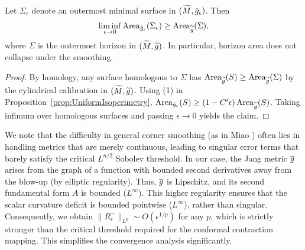 \begin{corollary}\label{cor:IsoperimetricStability}
Let $\Sigma_\epsilon$ denote an outermost minimal surface in $(\widetilde{M},\hat g_\epsilon)$. Then
\[
    \liminf_{\epsilon\to 0} \operatorname{Area}_{\hat g_\epsilon}(\Sigma_\epsilon) \ge \operatorname{Area}_{\widetilde{g}}(\Sigma),
\]
where $\Sigma$ is the outermost horizon in $(\widetilde{M},\widetilde{g})$. In particular, horizon area does not collapse under the smoothing.
\end{corollary}
\begin{proof}
By homology, any surface homologous to $\Sigma$ has $\operatorname{Area}_{\widetilde{g}}(S)\ge \operatorname{Area}_{\widetilde{g}}(\Sigma)$ by the cylindrical calibration in $(\widetilde{M},\widetilde{g})$. Using (1) in Proposition~\ref{prop:UniformIsoperimetry}, $\operatorname{Area}_{\hat g_\epsilon}(S)\ge (1-C'\epsilon)\operatorname{Area}_{\widetilde{g}}(S)$. Taking infimum over homologous surfaces and passing $\epsilon\to 0$ yields the claim.
\end{proof}

\begin{remark}
We note that the difficulty in general corner smoothing (as in Miao \cite{miao2002}) often lies in handling metrics that are merely continuous, leading to singular error terms that barely satisfy the critical $L^{n/2}$ Sobolev threshold.
In our case, the Jang metric $\overline{g}$ arises from the graph of a function with bounded second derivatives away from the blow-up (by elliptic regularity). Thus, $\overline{g}$ is Lipschitz, and its second fundamental form $A$ is bounded ($L^\infty$).
This higher regularity ensures that the scalar curvature deficit is bounded pointwise ($L^\infty$), rather than singular. Consequently, we obtain $\|R^-_\epsilon\|_{L^p} \sim O(\epsilon^{1/p})$ for any $p$, which is strictly stronger than the critical threshold required for the conformal contraction mapping. This simplifies the convergence analysis significantly.
\end{remark}

